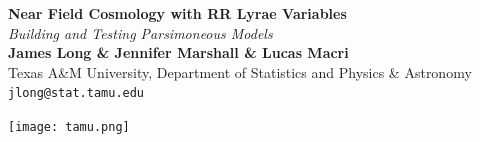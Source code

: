 \documentclass[a0,portrait]{a0poster}
\begin{document}


\begin{minipage}[b]{0.75\linewidth}
\veryHuge \color{NavyBlue} \textbf{Near Field Cosmology with RR Lyrae Variables} \color{Black}\\ %
\Huge\textit{Building and Testing Parsimoneous Models}\\[2cm] %
\huge \textbf{James Long \& Jennifer Marshall \& Lucas Macri}\\[0.5cm] %
\huge Texas A\&M University, Department of Statistics and Physics \& Astronomy\\[0.4cm] %
\Large \texttt{jlong@stat.tamu.edu}\\%
\end{minipage}
%
\begin{minipage}[b]{0.25\linewidth}
\texttt{[image: tamu.png]}\\
\end{minipage}

\vspace{1cm} %

\end{document}
